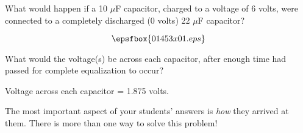 

What would happen if a 10 $\mu$F capacitor, charged to a voltage of 6 volts, were connected to a completely discharged (0 volts) 22 $\mu$F capacitor?

$$\epsfbox{01453x01.eps}$$

What would the voltage(s) be across each capacitor, after enough time had passed for complete equalization to occur?







Voltage across each capacitor = 1.875 volts.







The most important aspect of your students' answers is {\it how} they arrived at them.  There is more than one way to solve this problem!





